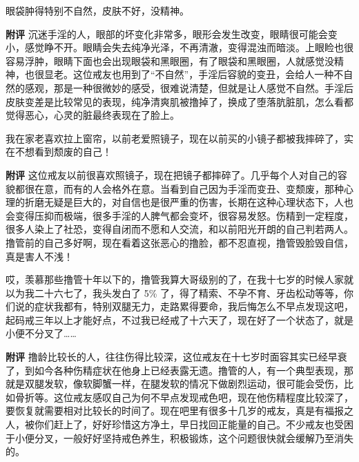 \begin{case}[变丑]
    眼袋肿得特别不自然，皮肤不好，没精神。

    \textbf{附评} 沉迷手淫的人，眼部的坏变化非常多，眼形会发生改变，眼睛很可能会变小，感觉睁不开。眼睛会失去纯净光泽，不再清澈，变得混浊而暗淡。上眼睑也很容易浮肿，眼睛下面也会出现眼袋和黑眼圈，有了眼袋和黑眼圈，人就感觉没精神，也很显老。这位戒友也用到了“不自然”，手淫后容貌的变丑，会给人一种不自然的感观，那是一种很微妙的感受，很难说清楚，但就是让人感觉不自然。手淫后皮肤变差是比较常见的表现，纯净清爽肌被撸掉了，换成了堕落肮脏肌，怎么看都觉得恶心，心灵的脏最终表现在了脸上。
\end{case}

\begin{case}[变丑]
    我在家老喜欢拉上窗帘，以前老爱照镜子，现在以前买的小镜子都被我摔碎了，实在不想看到颓废的自己！

    \textbf{附评} 这位戒友以前很喜欢照镜子，现在把镜子都摔碎了。几乎每个人对自己的容貌都很在意，而有的人会格外在意。当看到自己因为手淫而变丑、变颓废，那种心理的折磨无疑是巨大的，对自信也是很严重的伤害，长期在这种心理状态下，人也会变得压抑而极端，很多手淫的人脾气都会变坏，很容易发怒。伤精到一定程度，很多人染上了社恐，变得自闭而不愿和人交流，和以前阳光开朗的自己判若两人。撸管前的自己多好啊，现在看着这张恶心的撸脸，都不忍直视，撸管毁脸毁自信，真是害人不浅！
\end{case}

\begin{case}[变丑]
    哎，羡慕那些撸管十年以下的，撸管我算大哥级别的了，在我十七岁的时候人家就以为我二十六七了，我头发白了 5\% 了，得了精索、不孕不育、牙齿松动等等，你们说的症状我都有，特别双腿无力，走路累得要命，我后悔怎么不早点发现这吧，起码戒三年以上才能好点，不过我已经戒了十六天了，现在好了一个状态了，就是小便不分叉了……

    \textbf{附评} 撸龄比较长的人，往往伤得比较深，这位戒友在十七岁时面容其实已经早衰了，到如今各种伤精症状在他身上已经表露无遗。撸管的人，有一个典型表现，那就是双腿发软，像软脚蟹一样，在腿发软的情况下做剧烈运动，很可能会受伤，比如骨折等。这位戒友感叹自己为何不早点发现戒色吧，现在他伤精程度比较深了，要恢复就需要相对比较长的时间了。现在吧里有很多十几岁的戒友，真是有福报之人，被你们赶上了，好好珍惜这方净土，早日找回正能量的自己。不少戒友也受困于小便分叉，一般好好坚持戒色养生，积极锻炼，这个问题很快就会缓解乃至消失的。
\end{case}

